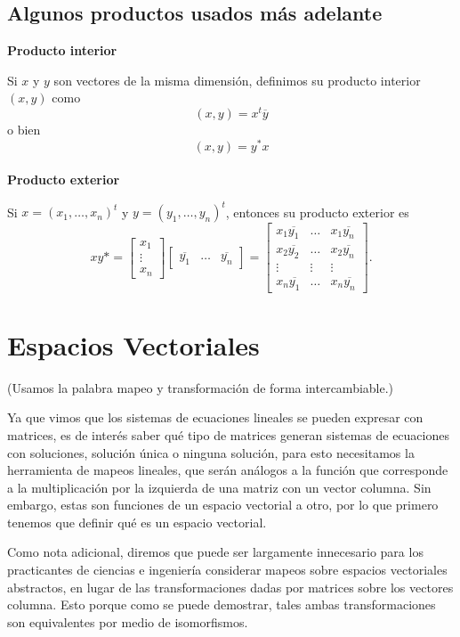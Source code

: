 \documentclass{article}
\begin{document}
\subsection{Algunos productos usados más adelante}
\textbf{Producto interior}

Si $x$ y $y$ son vectores de la misma dimensión, definimos su
producto interior $(x,y)$ como
\[(x,y) = x^t \overline y\]
o bien
\[(x,y) = y^* x\]
\\
\textbf{Producto exterior}

Si $x=(x_1,\ldots,x_n)^t$ y $y=(y_1,\ldots, y_n)^t$, entonces
su producto exterior es
$$x y* =
\begin{bmatrix} x_1 \\ \vdots \\ x_n \end{bmatrix}
\begin{bmatrix}
    \overline{y_1} & \ldots & \overline{y_n}
\end{bmatrix} =
\begin{bmatrix}
    x_1 \overline {y_1} & \ldots & x_1 \overline {y_n} \\
    x_2 \overline{y_2} & \ldots & x_2 \overline{y_n} \\
    \vdots & \vdots & \vdots \\
    x_n \overline{y_1} & \ldots & x_n \overline{y_n}
\end{bmatrix}.
$$
\newpage

\section{Espacios Vectoriales}
(Usamos la palabra mapeo y transformación de forma intercambiable.)

Ya que vimos que los sistemas de ecuaciones lineales se pueden expresar con matrices, es de interés saber qué tipo de matrices generan sistemas de ecuaciones con soluciones, solución única o ninguna solución, para esto necesitamos la herramienta de mapeos lineales, que serán análogos a la función que corresponde a la multiplicación por la izquierda de una matriz con un vector columna. Sin embargo, estas son funciones de un espacio vectorial a otro, por lo que primero tenemos que definir qué es un espacio vectorial.

Como nota adicional, diremos que puede ser largamente innecesario para los practicantes de ciencias e ingeniería considerar mapeos sobre espacios vectoriales abstractos, en lugar de las transformaciones dadas por matrices sobre los vectores columna. Esto porque como se puede demostrar, tales ambas transformaciones son equivalentes por medio de isomorfismos.
\end{document}
